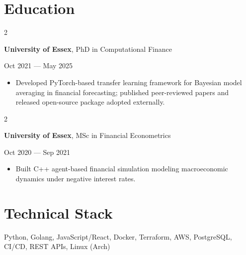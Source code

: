 \documentclass[6pt, letterpaper]{article}
\newenvironment{highlights}{
    \begin{itemize}[
        topsep=0.03 cm,
        parsep=0.03 cm,
        partopsep=0pt,
        itemsep=0pt,
        leftmargin=0 cm + 10pt
    ]
}{
    \end{itemize}
} %
\newenvironment{twocolentry}[2][]{
    \onecolentry
    \def\secondColumn{#2}
    \setcolumnwidth{\fill, 4.5 cm}
    \begin{paracol}{2}
}{
    \switchcolumn \raggedleft \secondColumn
    \end{paracol}
    \endonecolentry
} %
\begin{document}
    \section{Education}

            \begin{twocolentry}{
                Oct 2021 --- May 2025
            }
            \textbf{University of Essex}, PhD in Computational Finance
            \end{twocolentry}

            \begin{highlights}
            \item Developed PyTorch-based transfer learning framework for Bayesian model averaging in financial forecasting; published peer-reviewed papers and released open-source package adopted externally.
            \end{highlights}

            \begin{twocolentry}{
                Oct 2020 --- Sep 2021
            }
            \textbf{University of Essex}, MSc in Financial Econometrics
            \end{twocolentry}

            \begin{highlights}
            \item Built C++ agent-based financial simulation modeling macroeconomic dynamics under negative interest rates.
            \end{highlights}

        \section{Technical Stack}
        Python, Golang, JavaScript/React, Docker, Terraform, AWS, PostgreSQL, CI/CD, REST APIs, Linux (Arch)
\end{document}
